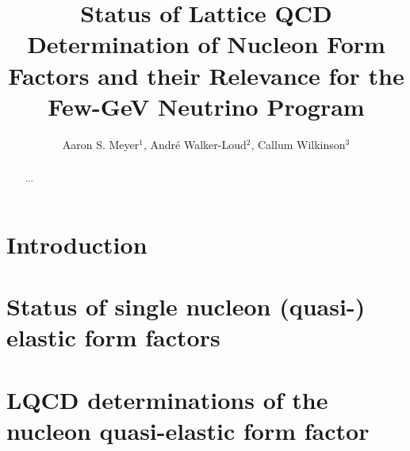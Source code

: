 \documentclass{ar-1col}
\begin{document}

\title{Status of Lattice QCD Determination of Nucleon Form Factors
 and their Relevance for the Few-GeV Neutrino Program}

\author{Aaron S. Meyer$^1$,
Andr\'{e} Walker-Loud$^2$,
Callum Wilkinson$^3$
}

\begin{abstract}
  ...
\end{abstract}

\begin{keywords}
\end{keywords}

\maketitle

\tableofcontents


\section{Introduction\label{sec:intro}}



\section{Status of single nucleon (quasi-) elastic form factors\label{sec:sof}}


\section{LQCD determinations of the nucleon quasi-elastic form factor\label{sec:lqcd}}

\end{document}
